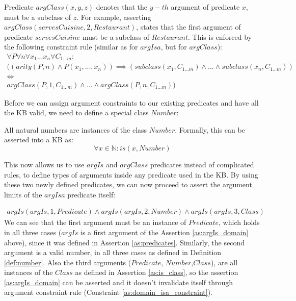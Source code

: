\begin{definition}\label{def:pred_argClass}
Predicate $argClass(x,y,z)$ denotes that the $y-th$ argument of predicate $x$, 
must be a subclass of $z$. For example, asserting 
\\$argClass(servesCuisine, 2, Restaurant)$, states that the first argument of 
predicate $servesCuisine$ must be a subclass of $Restaurant$.
This is enforced by the following constraint rule (similar as for $argIsa$, but
for $argClass$):
\begin{equation}\label{as:domain_class_constraint}
\begin{gathered}
  \forall P \forall n \forall x_1...x_n \forall C_{1...m}: \\
  ((arity(P,n) \land P(x_1,...,x_n)) \implies (subclass(x_1,C_{1...m}) \land ... \land subclass(x_n,C_{1...m})) \\ 
  \iff \\
  argClass(P,1,C_{1...m}) \land ... \land argClass(P,n,C_{1...m}))
\end{gathered}
\end{equation}
\end{definition}

Before we can assign argument constraints to our existing predicates and have
all the KB valid, we need to define a special class $Number$:

\begin{definition}\label{def:number}
All natural numbers are instances of the class $Number$. Formally, this can be
asserted into a KB as:
\begin{equation}\label{as:numbers}
	\forall x \in \mathbb{N}:is(x,Number)
\end{equation}
\end{definition}

This now allows us to use $argIs$ and $argClass$ predicates instead of 
complicated rules, to define types of arguments inside any predicate used in the
KB. By using these two newly defined predicates, we can now proceed to assert 
the argument limits of the $argIsa$ predicate itself: 

\begin{equation}\label{as:argIs_domain}
\begin{gathered}
argIs(argIs,1,Predicate) \land argIs(argIs,2,Number) \land argIs(argIs,3,Class) 
\end{gathered}
\end{equation}
We can see that the first argument must be an instance of $Predicate$, which 
holds in all three cases ($argIs$ is a first argument of the Assertion 
\ref{as:argIs_domain} above), since it was defined in Assertion 
\ref{as:predicates}. Similarly, the second argument is a valid number, in all 
three cases as defined in Definition \ref{def:number}. Also the third arguments
($Predicate$, $Number$,$Class$), are all instances of the $Class$ as defined in
Assertion \ref{as:is_class}, so the assertion \ref{as:argIs_domain} can be asserted
and it doesn't invalidate itself through argument constraint rule (Constraint 
\ref{as:domain_isa_constraint}).

